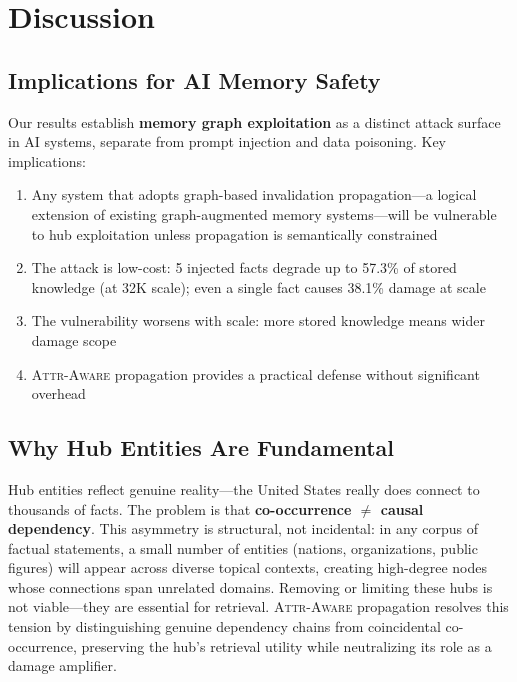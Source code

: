 \documentclass[11pt]{article}
\newcommand{\attraware}{\textsc{Attr-Aware}}
\begin{document}
\section{Discussion}
\label{sec:discussion}

\subsection{Implications for AI Memory Safety}

Our results establish \textbf{memory graph exploitation} as a distinct attack surface in AI systems, separate from prompt injection and data poisoning. Key implications:
\begin{enumerate}
  \item Any system that adopts graph-based invalidation propagation---a logical extension of existing graph-augmented memory systems---will be vulnerable to hub exploitation unless propagation is semantically constrained
  \item The attack is low-cost: 5 injected facts degrade up to 57.3\% of stored knowledge (at 32K scale); even a single fact causes 38.1\% damage at scale
  \item The vulnerability worsens with scale: more stored knowledge means wider damage scope
  \item \attraware{} propagation provides a practical defense without significant overhead
\end{enumerate}

\subsection{Why Hub Entities Are Fundamental}

Hub entities reflect genuine reality---the United States really does connect to thousands of facts.
The problem is that \textbf{co-occurrence $\neq$ causal dependency}.
This asymmetry is structural, not incidental: in any corpus of factual statements, a small number of entities (nations, organizations, public figures) will appear across diverse topical contexts, creating high-degree nodes whose connections span unrelated domains.
Removing or limiting these hubs is not viable---they are essential for retrieval.
\attraware{} propagation resolves this tension by distinguishing genuine dependency chains from coincidental co-occurrence, preserving the hub's retrieval utility while neutralizing its role as a damage amplifier.
\end{document}
